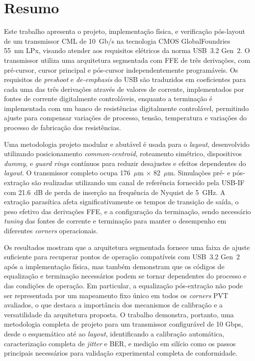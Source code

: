 \chapter*{Resumo}

Este trabalho apresenta o projeto, implementação física, e verificação pós-layout de um transmissor \ac{CML} de 10~Gb/s na tecnologia CMOS GlobalFoundries 55~nm LPx, visando atender aos requisitos elétricos da norma USB~3.2 Gen~2. O transmissor utiliza uma arquitetura segmentada com \ac{FFE} de três derivações, com pré-cursor, cursor principal e pós-cursor independentemente programáveis. Os requisitos de \textit{preshoot} e \textit{de-emphasis} do USB são traduzidos em coeficientes para cada uma das três derivações através de valores de corrente, implementados por fontes de corrente digitalmente controláveis, enquanto a terminação é implementada com um banco de resistências digitalmente controlável, permitindo ajuste para compensar variações de processo, tensão, temperatura e variações do processo de fabricação dos resistências.

Uma metodologia projeto modular e abutável é usada para o \textit{layout}, desenvolvido utilizando posicionamento \textit{common-centroid}, roteamento simétrico, dispositivos \textit{dummy}, e \textit{guard rings} contínuos para reduzir desajustes e efeitos dependentes do \textit{layout}. O transmissor completo ocupa 176~$\mu$m $\times$ 82~$\mu$m. Simulações pré- e pós-extração são realizadas utilizando um canal de referência fornecido pela USB-IF com 21.6~dB de perda de inserção na frequência de Nyquist de 5~GHz. A extração parasítica afeta significativamente os tempos de transição de saída, o peso efetivo das derivações \ac{FFE}, e a configuração da terminação, sendo necessário \textit{tuning} das fontes de corrente e terminação para manter o desempenho em diferentes \textit{corners} operacionais.

Os resultados mostram que a arquitetura segmentada fornece uma faixa de ajuste suficiente para recuperar pontos de operação compatíveis com USB~3.2 Gen~2 após a implementação física, mas também demonstram que os códigos de equalização e terminação necessários podem se tornar dependentes do processo e das condições de operação. Em particular, a equalização pós-extração não pode ser representada por um mapeamento fixo único em todos os \textit{corners} PVT avaliados, o que destaca a importância dos mecanismos de calibração e a versatilidade da arquitetura proposta. O trabalho demonstra, portanto, uma metodologia completa de projeto para um transmissor configurável de 10 Gbps, desde o esquemático até ao \textit{layout}, identificando a calibração automática, caracterização completa de \textit{jitter} e \ac{BER}, e medição em silício como os passos principais necessários para validação experimental completa de conformidade.

